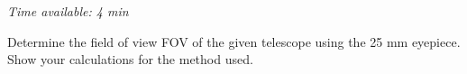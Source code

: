 \emph{Time available: 4 min}

Determine the field of view FOV of the given telescope using the 25 mm
eyepiece. Show your calculations for the method used.
